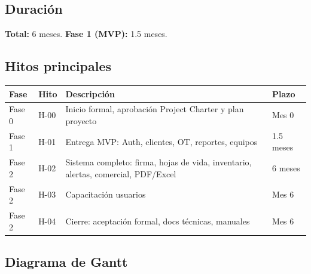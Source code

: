 \documentclass[12pt,a4paper]{article}
\begin{document}
\subsection{Duración}

\textbf{Total:} 6 meses. \textbf{Fase 1 (MVP):} 1.5 meses.

\subsection{Hitos principales}

\vspace{0.3cm}
\begin{longtable}{|L{1.2cm}|L{2.2cm}|L{5.2cm}|L{2.0cm}|}
\hline
\textbf{Fase} & \textbf{Hito} & \textbf{Descripción} & \textbf{Plazo} \\
\hline
\endhead

Fase 0 & H-00 & Inicio formal, aprobación Project Charter y plan proyecto & Mes 0 \\
\hline

Fase 1 & H-01 & Entrega MVP: Auth, clientes, OT, reportes, equipos & 1.5 meses \\
\hline

Fase 2 & H-02 & Sistema completo: firma, hojas de vida, inventario, alertas, comercial, PDF/Excel & 6 meses \\
\hline

Fase 2 & H-03 & Capacitación usuarios & Mes 6 \\
\hline

Fase 2 & H-04 & Cierre: aceptación formal, docs técnicas, manuales & Mes 6 \\
\hline

\end{longtable}

\subsection{Diagrama de Gantt}

\end{document}
